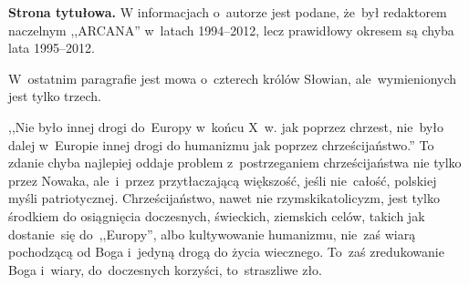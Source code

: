 \documentclass[a4paper,11pt]{article}
\begin{document}

\vspace{\spaceTwo}








\start \textbf{Strona tytułowa.} W informacjach o~autorze jest podane,
że~był redaktorem naczelnym ,,ARCANA'' w~latach 1994--2012, lecz
prawidłowy okresem są chyba lata 1995--2012.

\vspace{\spaceFour}


\start {} W~ostatnim paragrafie jest mowa o~czterech królów
Słowian, ale~wymienionych jest tylko trzech.

\vspace{\spaceFour}


\start {} ,,Nie było innej drogi do~Europy w~końcu X~w.
jak poprzez chrzest, nie~było dalej w~Europie innej drogi do humanizmu
jak poprzez chrześcijaństwo.'' To zdanie chyba najlepiej oddaje
problem z~postrzeganiem chrześcijaństwa nie tylko przez Nowaka,
ale~i~przez przytłaczającą większość, jeśli nie~całość, polskiej myśli
patriotycznej. Chrześcijaństwo, nawet nie rzymski\dywiz katolicyzm,
jest tylko środkiem do osiągnięcia doczesnych, świeckich, ziemskich
celów, takich jak dostanie~się do~,,Europy'', albo kultywowanie
humanizmu, nie~zaś wiarą pochodzącą od Boga i~jedyną drogą do życia
wiecznego. To~zaś zredukowanie Boga i~wiary, do~doczesnych korzyści,
to~straszliwe zło.

\vspace{\spaceFour}
\end{document}
